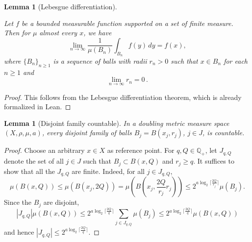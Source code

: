 \documentclass[10pt,a4paper]{article}
\theoremstyle{plain}
\newtheorem{lemma}[theorem]{Lemma}
\theoremstyle{definition}
\numberwithin{equation}{subsection}
\newcommand{\Q}{{\mathbb{Q}}}
\newcommand{\lean}[1]{}
\newcommand{\leanok}{}
\begin{document}
\begin{lemma}[Lebesgue differentiation]
    \label{Lebesgue-differentiation}
    \leanok
    \lean{lebesgue_differentiation}
    Let $f$ be a bounded measurable function supported on a set of finite measure. Then for $\mu$ almost every $x$, we have
    $$\lim_{n\to \infty} \frac{1}{\mu(B_n)}\int_{B_n} f(y)\, dy= f(x),$$
    where $\{B_n\}_{n\geq 1}$ is a sequence of balls with radii $r_n>0$ such that $x\in B_n$ for each $n\geq 1$ and
    \begin{equation*}
        \lim_{n\to \infty} r_n=0 \,.
    \end{equation*}
\end{lemma}
\begin{proof}
    \leanok
    This follows from the Lebesgue differentiation theorem, which is already formalized in Lean.
\end{proof}

\begin{lemma}[Disjoint family countable]
    \leanok
    \lean{Pairwise.countable_of_isOpen_disjoint}
    \label{disjoint-family-countable}
    In a doubling metric measure space $(X,\rho,\mu, a)$, every disjoint family of balls $B_j = B(x_j, r_j)$, $j\in J$, is countable.
\end{lemma}
\begin{proof}
    \leanok
    Choose an arbitrary $x\in X$ as reference point. For $q, Q\in\Q_+$, let $J_{q,Q}$ denote the set of all $j\in J$ such that $B_j\subset B(x, Q)$ and $r_j \ge q$. It suffices to show that all the $J_{q,Q}$ are finite.
    Indeed, for all $j\in J_{q,Q}$,
    \begin{equation*}
        \mu(B(x, Q)) \le \mu(B(x_j, 2Q)) = \mu(B(x_j, \frac{2 Q}{r_j} r_j))
        \le 2^{a\log_2{\lceil \frac{2 Q}{r_j}\rceil}} \mu(B_j).
    \end{equation*}
    Since the $B_j$ are disjoint,
    \begin{equation}
        |J_{q,Q}| \mu(B(x, Q)) \le 2^{a\log_2{\lceil\frac{2Q}{q}\rceil}} \sum_{j\in J_{q,Q}} \mu(B_j) \le 2^{a\log_2{\lceil\frac{2Q}{q}\rceil}} \mu(B(x,Q))
    \end{equation}
    and hence $|J_{q,Q}| \le 2^{a\log_2{\lceil\frac{2Q}{q}\rceil}}$.
\end{proof}
\end{document}
